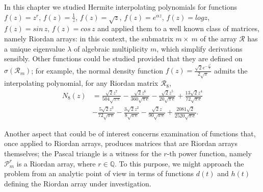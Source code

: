 
In this chapter we studied Hermite interpolating polynomials for functions
$f(z)=z^{r}$, ${f(z)=\frac{1}{z}}$, ${f(z)=\sqrt{z}}$, ${f(z)=e^{\alpha z}}$,
${f(z)=log{z}}$,\\\noindent ${f(z)=sin\,{z}}$, ${f(z)=cos\,{z}}$ and applied
them to a well known class of matrices, namely Riordan arrays: in this context,
the submatrix $m\times~m$ of the array $\mathcal{R}$ has a unique eigenvalue
$\lambda$ of algebraic multiplicity $m$, which simplify derivations sensibly.
Other functions could be studied provided that they are defined on
$\sigma(\mathcal{R}_{m})$; for example, the normal density function
$\displaystyle f{\left (z \right )} = \frac{\sqrt{2} e^{- \frac{z^{2}}{2}}}{2
\sqrt{\pi}}$ admits the interpolating polynomial, for any Riordan matrix
$\mathcal{R}_{8}$,
\begin{displaymath}
\begin{split}
{N_{ 8 }}{\left (z \right )} &=
\frac{\sqrt{2} z^{7}}{504 \sqrt{\pi\,e} } - \frac{\sqrt{2}
z^{6}}{360 \sqrt{\pi\,e} } - \frac{\sqrt{2} z^{5}}{20 \sqrt{\pi\,e}
} + \frac{13 \sqrt{2} z^{4}}{72 \sqrt{\pi\,e} }\\
&- \frac{5 \sqrt{2} z^{3}}{72 \sqrt{\pi\,e} } - \frac{3 \sqrt{2}
z^{2}}{8 \sqrt{\pi\,e} } - \frac{\sqrt{2} z}{90 \sqrt{\pi\,e}
} + \frac{2081 \sqrt{2}}{2520 \sqrt{\pi\,e} }.
\end{split}
\end{displaymath}


    Another aspect that could be of interest concerns
    examination of functions that, once applied to Riordan arrays, produces
    matrices that are Riordan arrays themselves; the Pascal triangle is a
    witness for the $r$-th power function, namely $\mathcal{P}_{m}^{r}$ is a
    Riordan array, where $r\in\mathbb{Q}$. To this purpose, we might approach
    the problem from an analytic point of view in terms of functions $d(t)$ and
    $h(t)$ defining the Riordan array under investigation.



